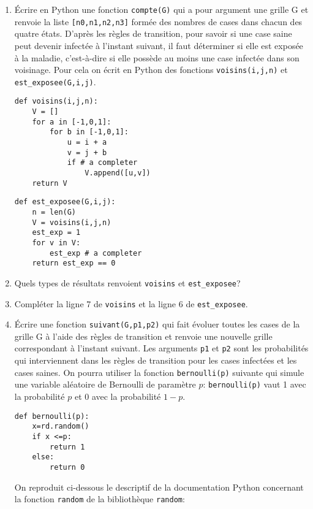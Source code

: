 \begin{enumerate}
\item \'Ecrire en Python une fonction \texttt{compte(G)} qui a pour argument une grille G et renvoie la liste \texttt{[n0,n1,n2,n3]} form\'ee des nombres de cases dans chacun des quatre \'etats. 
D'apr\`es les r\`egles de transition, pour savoir si une case saine peut devenir infect\'ee \`a l'instant suivant, il faut d\'eterminer si elle est expos\'ee \`a la maladie, c'est-\`a-dire si elle poss\`ede au moins une case infect\'ee dans son voisinage. 
Pour cela on écrit en Python des fonctions \texttt{voisins(i,j,n)} et \texttt{est\_exposee(G,i,j)}.
\begin{lstlisting}
def voisins(i,j,n):
    V = []
    for a in [-1,0,1]:
        for b in [-1,0,1]:
            u = i + a
            v = j + b
            if # a completer
                V.append([u,v])
    return V
\end{lstlisting}
\begin{lstlisting}
def est_exposee(G,i,j):
    n = len(G)
    V = voisins(i,j,n)
    est_exp = 1
    for v in V:
        est_exp # a completer
    return est_exp == 0
\end{lstlisting}
\item Quels types de r\'esultats renvoient \texttt{voisins} et \texttt{est\_exposee}?
\item Compl\'eter la ligne 7 de \texttt{voisins} et la ligne 6 de \texttt{est\_exposee}.
\item \'Ecrire une fonction \texttt{suivant(G,p1,p2)} qui fait \'evoluer toutes les cases de la grille G \`a l'aide des r\`egles de transition et renvoie une nouvelle grille correspondant \`a l'instant suivant. Les arguments \texttt{p1} et \texttt{p2} sont les probabilit\'es qui interviennent dans les r\`egles de transition pour les cases infect\'ees et les cases saines. On pourra utiliser la fonction \texttt{bernoulli(p)} suivante qui simule une variable al\'eatoire de Bernoulli de param\`etre $p$: \texttt{bernoulli(p)} vaut 1 avec la probabilit\'e $p$ et 0 avec la probabilit\'e $1-p$.
\begin{lstlisting}
def bernoulli(p):
	x=rd.random()
	if x <=p:
		return 1
	else:
		return 0	
\end{lstlisting}
On reproduit ci-dessous le descriptif de la documentation Python concernant la fonction \texttt{random} de la biblioth\`eque \texttt{random}:


\end{enumerate}
